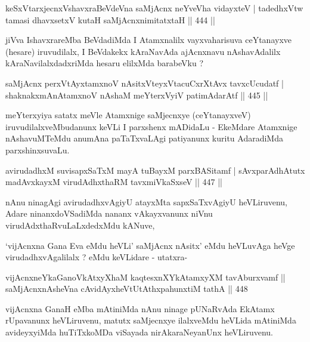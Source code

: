 \begin{shl}
keSxVtarxjecnxVshavxraBeVdeVna saMjAcnx neYveVha vidayxteV |
tadedhxVtw tamasi dhavxsetxV kutaH saMjAcnx\s nimitatxtaH \hfill  || 444 ||
\end{shl}

\begin{artha}
jiVva IshavxrareMba BeVdadiMda I Atamxnalilx vayxvaharisuva ceYtanayxve
(hesare) iruvudilalx, I BeVdakekx kAraNavAda ajAcnxnavu nAshavAdalilx
kAraNavilalxdadxriMda hesaru elilxMda barabeVku ?
\end{artha}

\begin{shl}
saMjAcnx perxVtAyx\s \s tamxnoV nAsitxVteyxVtacuCxrXtAvx tavxcUcudatf |
shaknakxmAnA\s \s tamxnoV nAshaM meYterxVyiV patimAdarAtf \hfill  || 445 ||
\end{shl}

\begin{artha}
meYterxyiya satatx meVle Atamxnige saMjecnxye (ceYtanayxveV)
iruvudilalxveMbudanunx keVLi I parxshenx mADidaLu - EkeMdare Atamxnige
nAshavuMTeMdu anumAna paTaTxvaLAgi patiyanunx kuritu AdaradiMda parxshinxsuvaLu.
\end{artha}

\begin{shl}
avirudadhxM suvisapxSaTxM mayA tuBayxM parxBASitamf |
sAvxparAdhAtutx madAvxkayxM virudAdhxthaRM tavxmiVkaSxseV \hfill  || 447 ||
\end{shl}

\begin{artha}
nAnu ninagAgi avirudadhxvAgiyU atayxMta sapxSaTxvAgiyU heVLiruvenu,
Adare ninanxdoVSadiMda nananx vAkayxvanunx niVnu
virudAdxthaRvuLaLxdedxMdu kANuve,
\end{artha}

\begin{artha}
`vijAcnxna Gana Eva eMdu heVLi' saMjAcnx nAsitx' eMdu heVLuvAga heVge
  virudadhxvAgalilalx ? eMdu keVLidare - utatxra-
\end{artha}

\begin{shl}
vijAcnxneYkaGanoVkAtxyX\s haM kaqtesxnXYkAtamxyXM tavAburxvamf ||
saMjAcnxnAsheVna cAvidAyxheVtUtAthxpahunxtiM tathA \hfill  || 448\end{shl}

\begin{artha}
vijAcnxna GanaH eMba mAtiniMda nAnu ninage pUNaRvAda EkAtamx rUpavanunx heVLiruvenu, matutx saMjecnxye ilalxveMdu heVLida mAtiniMda avideyxyiMda huTiTxkoMDa viSayada nirAkaraNeyanUnx heVLiruvenu.
\end{artha}

